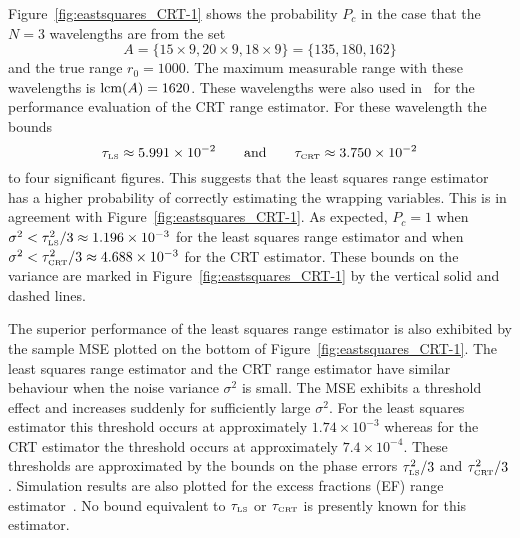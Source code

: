 Figure~\ref{fig:eastsquares_CRT-1} shows the probability $P_c$ in the case that the $N=3$ wavelengths are from the set
\[
A = \{15 \times 9, 20 \times 9, 18 \times 9\} = \{135,   180,   162\}
\]
and the true range $r_0 = 1000$. The maximum measurable range with these wavelengths is $\operatorname{lcm}(A) = 1620$. These wavelengths were also used in~\cite{Xiao_multistage_crt_2014} for the performance evaluation of the CRT range estimator.  %
For these wavelength the bounds 
\[
\tau_{\text{\tiny{LS}}} \approx 5.991 \times 10^{-2} \qquad \text{and} \qquad \tau_{\text{\tiny{CRT}}} \approx 3.750 \times 10^{-2}
\]
to four significant figures. This suggests that the least squares range estimator has a higher probability of correctly estimating the wrapping variables. This is in agreement with Figure~\ref{fig:eastsquares_CRT-1}.  As expected, $P_c = 1$ when $\sigma^2 < \tau_{\text{\tiny{LS}}}^2/3 \approx 1.196\times 10^{-3}$ for the least squares range estimator and when $\sigma^2 < \tau_{\text{\tiny{CRT}}}^2/3 \approx 4.688 \times 10^{-3}$ for the CRT estimator.  These bounds on the variance are marked in Figure~\ref{fig:eastsquares_CRT-1} by the vertical solid and dashed lines.

The superior performance of the least squares range estimator is also exhibited by the sample MSE plotted on the bottom of  
Figure~\ref{fig:eastsquares_CRT-1}. The least squares range estimator and the CRT range estimator have similar behaviour when the noise variance $\sigma^2$ is small. The MSE exhibits a threshold effect and increases suddenly for sufficiently large $\sigma^2$. For the least squares estimator this threshold occurs at approximately $1.74\times 10^{-3}$ whereas for the CRT estimator the threshold occurs at approximately $7.4\times 10^{-4}$. These thresholds are approximated by the bounds on the phase errors $\tau_{\text{\tiny{LS}}}^2/3$ and $\tau_{\text{\tiny{CRT}}}^2/3$. %
Simulation results are also plotted for the excess fractions (EF) range estimator~\cite{Falaggis_excess_fractions_2013}.  No bound equivalent to $\tau_{\text{\tiny{LS}}}$ or $\tau_{\text{\tiny{CRT}}}$ is presently known for this estimator.

